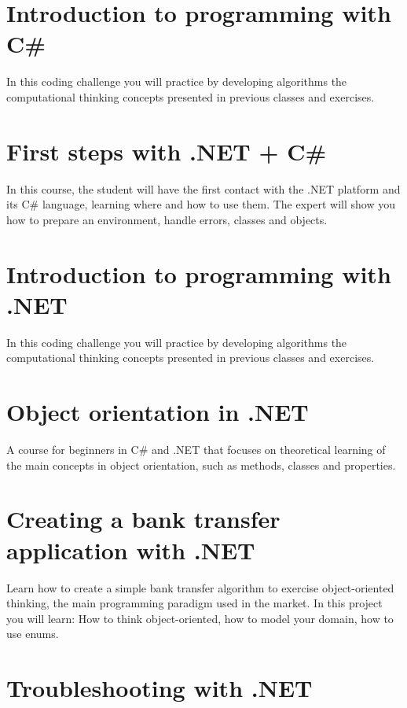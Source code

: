 \documentclass[12pt,executivepaper]{article}
\begin{document}
	\section{Introduction to programming with C\#}
	
	In this coding challenge you will practice by developing algorithms the computational thinking concepts presented in previous classes and exercises.
	
	\section{First steps with .NET + C\#}
	
	In this course, the student will have the first contact with the .NET platform and its C\# language, learning where and how to use them. The expert will show you how to prepare an environment, handle errors, classes and objects.
	
	\section{Introduction to programming with .NET}
	
	In this coding challenge you will practice by developing algorithms the computational thinking concepts presented in previous classes and exercises.
	
	\section{Object orientation in .NET}
	
	A course for beginners in C\# and .NET that focuses on theoretical learning of the main concepts in object orientation, such as methods, classes and properties.
	
	\section{Creating a bank transfer application with .NET}
	
	Learn how to create a simple bank transfer algorithm to exercise object-oriented thinking, the main programming paradigm used in the market. In this project you will learn: How to think object-oriented, how to model your domain, how to use enums.
	
	\section{Troubleshooting with .NET}
	
\end{document}
